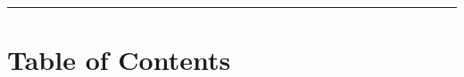 \documentclass[11pt]{article}
\begin{document}
\vspace{-0.2em}
{\color{indink}\rule{\linewidth}{1.6pt}}

\clearpage

\section{Table of Contents}
{\setlength{\parskip}{0pt}\small\makeatletter{}\makeatother}
\clearpage
\clearpage
\clearpage
\clearpage
\clearpage
\clearpage
\clearpage
\clearpage
\clearpage
\clearpage
\clearpage

\end{document}
